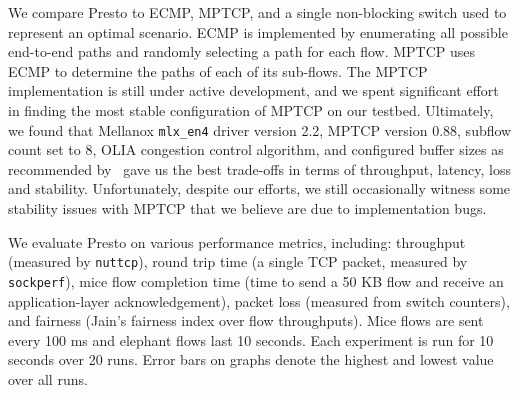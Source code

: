 We compare Presto to ECMP, MPTCP, and a 
single non-blocking switch used to represent an optimal scenario.
ECMP is implemented by enumerating all possible end-to-end paths and randomly selecting a path for each flow.
MPTCP uses ECMP to determine the paths of each of its sub-flows.
The MPTCP implementation is still under active development, and
we spent significant effort in finding the most stable configuration of MPTCP on our testbed. Ultimately, we found that Mellanox {\tt mlx\_en4} driver version
2.2, MPTCP version 0.88, subflow count set to 8, OLIA congestion control algorithm, and configured buffer sizes
as recommended by~\cite{dc-mptcp} gave us the best trade-offs in terms of throughput, latency, loss and stability.
Unfortunately, despite our efforts, we still occasionally witness some stability issues 
with MPTCP that we believe are due to implementation bugs.

We evaluate Presto on various performance metrics, including: 
throughput (measured by {\tt nuttcp}), 
round trip time (a single TCP packet, measured by {\tt sockperf}), 
mice flow completion time (time to send a 50 KB flow and receive an application-layer acknowledgement), packet loss (measured from switch counters), 
and fairness (Jain's fairness index over flow throughputs).  Mice flows are sent every 100 ms and elephant flows last 10 seconds. 
Each experiment is run for 10 seconds over 20 runs. Error bars on graphs denote
the highest and lowest value over all runs.

